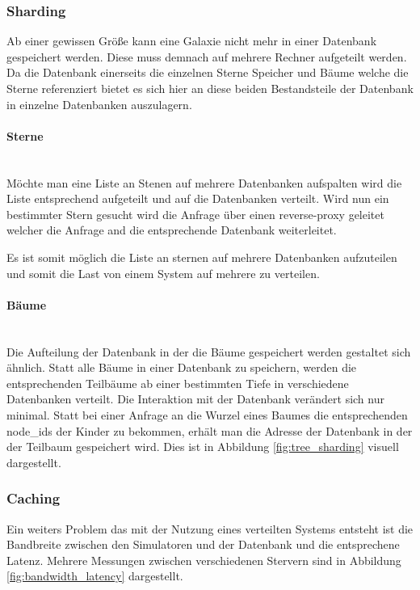 \subsubsection{Sharding}
Ab einer gewissen Größe kann eine Galaxie nicht mehr in einer Datenbank
gespeichert werden. Diese muss demnach auf mehrere Rechner aufgeteilt werden.
Da die Datenbank einerseits die einzelnen Sterne Speicher und Bäume welche die
Sterne referenziert bietet es sich hier an diese beiden Bestandsteile der
Datenbank in einzelne Datenbanken auszulagern.

\paragraph{Sterne} ~\\
Möchte man eine Liste an Stenen auf mehrere Datenbanken aufspalten wird die
Liste entsprechend aufgeteilt und auf die Datenbanken verteilt. Wird nun ein
bestimmter Stern gesucht wird die Anfrage über einen reverse-proxy geleitet
welcher die Anfrage and die entsprechende Datenbank weiterleitet. 

\par Es ist somit möglich die Liste an sternen auf mehrere Datenbanken
aufzuteilen und somit die Last von einem System auf mehrere zu verteilen.

\paragraph{Bäume} ~\\
Die Aufteilung der Datenbank in der die Bäume gespeichert werden gestaltet sich
ähnlich. Statt alle Bäume in einer Datenbank zu speichern, werden die
entsprechenden Teilbäume ab einer bestimmten Tiefe in verschiedene Datenbanken
verteilt. Die Interaktion mit der Datenbank verändert sich nur minimal. Statt
bei einer Anfrage an die Wurzel eines Baumes die entsprechenden node\_ids der
Kinder zu bekommen, erhält man die Adresse der Datenbank in der der Teilbaum
gespeichert wird. Dies ist in Abbildung \ref{fig:tree_sharding} visuell dargestellt.

\subsubsection{Caching}
Ein weiters Problem das mit der Nutzung eines verteilten Systems entsteht ist
die Bandbreite zwischen den Simulatoren und der Datenbank und die entsprechene
Latenz. Mehrere Messungen zwischen verschiedenen Stervern sind in Abbildung
\ref{fig:bandwidth_latency} dargestellt.


